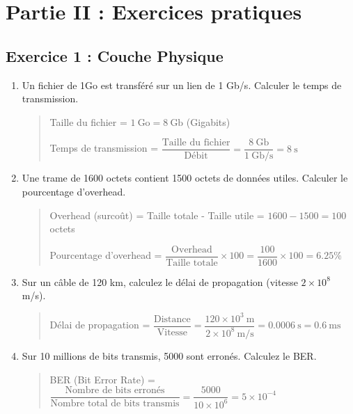 \documentclass[a4paper,12pt]{article}
\begin{document}
\section*{Partie II : Exercices pratiques}

\subsection*{Exercice 1 : Couche Physique}
\begin{enumerate}
    \item Un fichier de 1Go est transféré sur un lien de 1 Gb/s. Calculer le temps de transmission.
    \begin{quote}
        Taille du fichier = $1~\text{Go} = 8~\text{Gb}$ (Gigabits)

        Temps de transmission = $\dfrac{\text{Taille du fichier}}{\text{Débit}} = \dfrac{8~\text{Gb}}{1~\text{Gb/s}} = 8~\text{s}$
    \end{quote}

    \item Une trame de 1600 octets contient 1500 octets de données utiles. Calculer le pourcentage d'overhead.
    \begin{quote}
        Overhead (surcoût) = Taille totale - Taille utile = $1600 - 1500 = 100$ octets

        Pourcentage d'overhead = $\dfrac{\text{Overhead}}{\text{Taille totale}} \times 100 = \dfrac{100}{1600} \times 100 = 6.25\%$
    \end{quote}

    \item Sur un câble de 120 km, calculez le délai de propagation (vitesse $2\times10^8$ m/s).
    \begin{quote}
        Délai de propagation = $\dfrac{\text{Distance}}{\text{Vitesse}} = \dfrac{120 \times 10^3~\text{m}}{2 \times 10^8~\text{m/s}} = 0.0006~\text{s} = 0.6~\text{ms}$
    \end{quote}

    \item Sur 10 millions de bits transmis, 5000 sont erronés. Calculez le BER.
    \begin{quote}
        BER (Bit Error Rate) = $\dfrac{\text{Nombre de bits erronés}}{\text{Nombre total de bits transmis}} = \dfrac{5000}{10 \times 10^6} = 5 \times 10^{-4}$
    \end{quote}
\end{enumerate}
\end{document}
